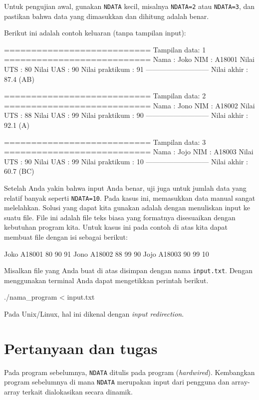 \documentclass[a4paper,11pt]{extarticle}
\begin{document}
Untuk pengujian awal, gunakan \texttt{NDATA} kecil, misalnya \texttt{NDATA=2} atau
\texttt{NDATA=3}, dan pastikan bahwa data yang dimasukkan dan dihitung adalah benar.

Berikut ini adalah contoh keluaran (tanpa tampilan input):
\begin{textcode}
===========================
Tampilan data: 1
===========================
Nama            : Joko
NIM             : A18001
Nilai UTS       : 80
Nilai UAS       : 90
Nilai praktikum : 91
---------------------------
Nilai akhir     : 87.4 (AB)

===========================
Tampilan data: 2
===========================
Nama            : Jono
NIM             : A18002
Nilai UTS       : 88
Nilai UAS       : 99
Nilai praktikum : 90
---------------------------
Nilai akhir     : 92.1 (A)

===========================
Tampilan data: 3
===========================
Nama            : Jojo
NIM             : A18003
Nilai UTS       : 90
Nilai UAS       : 99
Nilai praktikum : 10
---------------------------
Nilai akhir     : 60.7 (BC)
\end{textcode}

Setelah Anda yakin bahwa input Anda benar, uji juga untuk jumlah data yang relatif
banyak seperti \texttt{NDATA=10}. Pada kasus ini, memasukkan data manual sangat melelahkan.
Solusi yang dapat kita gunakan adalah dengan menuliskan input ke suatu file.
File ini adalah file teks biasa yang formatnya disesuaikan dengan kebutuhan program
kita. Untuk kasus ini pada contoh di atas kita dapat membuat file dengan isi sebagai
berikut:
\begin{textcode}
Joko A18001 80 90 91
Jono A18002 88 99 90
Jojo A18003 90 99 10
\end{textcode}
Misalkan file yang Anda buat di atas disimpan dengan nama \texttt{input.txt}.
Dengan menggunakan terminal Anda dapat mengetikkan perintah berikut.
\begin{textcode}
./nama_program < input.txt
\end{textcode}
Pada Unix/Linux, hal ini dikenal dengan \textit{input redirection}.

\section{Pertanyaan dan tugas}

Pada program sebelumnya, \texttt{NDATA} ditulis pada program
(\textit{hardwired}). Kembangkan program sebelumnya di mana \texttt{NDATA}
merupakan input dari pengguna dan array-array terkait dialokasikan secara
dinamik.
\end{document}
